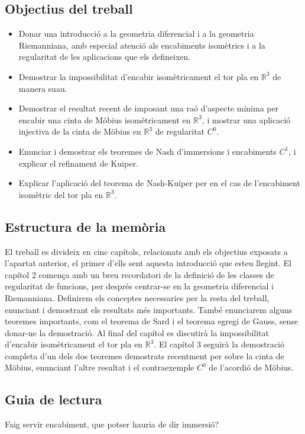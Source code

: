 \subsection*{Objectius del treball}
\begin{itemize}
    \item Donar una introducció a la geometria diferencial i a la geometria Riemanniana, amb especial atenció als encabiments isomètrics i a la regularitat de les aplicacions que els defineixen.
    \item Demostrar la impossibilitat d'encabir isomètricament el tor pla en $\mathbb R^3$ de manera suau.
    \item Demostrar el resultat recent de \cite{schwartz2024} imposant una raó d'aspecte mínima per encabir una cinta de Möbius isomètricament en $\mathbb R^3$, i mostrar una aplicació injectiva de la cinta de Möbius en $\mathbb R^3$ de regularitat $C^0$.
    \item Enunciar i demostrar els teoremes de Nash d'immersions i encabiments $C^1$, i explicar el refinament de Kuiper.
    \item Explicar l'aplicació del teorema de Nash-Kuiper per \cite{borrelli2013} en el cas de l'encabiment isomètric del tor pla en $\mathbb R^3$.
\end{itemize}

\subsection*{Estructura de la mem\`oria}
El treball es divideix en cinc capítols, relacionats amb els objectius exposats a l'apartat anterior, el primer d'ells sent aquesta introducció que esteu llegint. El capítol 2 comença amb un breu recordatori de la definició de les classes de regularitat de funcions, per després centrar-se en la geometria diferencial i Riemanniana. Definirem els conceptes necessaries per la resta del treball, enunciant i demostrant els resultats més importants. També enunciarem alguns teoremes importants, com el teorema de Sard i el teorema egregi de Gauss, sense donar-ne la demostració. Al final del capítol es discutirà la impossibilitat d'encabir isomètricament el tor pla en $\mathbb R^3$. El capítol 3 seguirà la demostració completa d'un dels dos teoremes demostrats recentment per \cite{schwartz2024} sobre la cinta de Möbius, enunciant l'altre resultat i el contraexemple $C^0$ de l'acordió de Möbius.
\subsection*{Guia de lectura}
Faig servir encabiment, que potser hauria de dir immersió?

